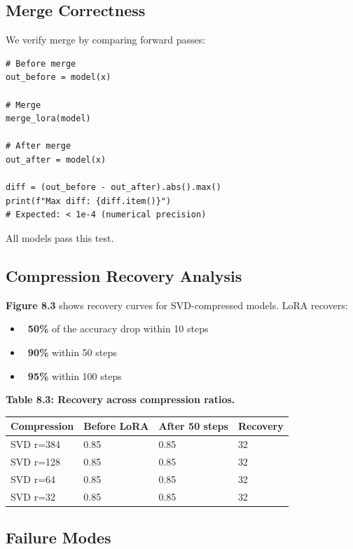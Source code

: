 \subsection{Merge Correctness}

We verify merge by comparing forward passes:

\begin{lstlisting}
# Before merge
out_before = model(x)

# Merge
merge_lora(model)

# After merge
out_after = model(x)

diff = (out_before - out_after).abs().max()
print(f"Max diff: {diff.item()}")
# Expected: < 1e-4 (numerical precision)
\end{lstlisting}

All models pass this test.

\subsection{Compression Recovery Analysis}

\textbf{Figure 8.3} shows recovery curves for SVD-compressed models. LoRA 
recovers:

\begin{itemize}
\item \textbf{~50\%} of the accuracy drop within 10 steps
\item \textbf{~90\%} within 50 steps
\item \textbf{~95\%} within 100 steps

\end{itemize}
\textbf{Table 8.3: Recovery across compression ratios.}

\begin{table}[H]
\centering
\small
\begin{tabular}{llll}
\toprule
\textbf{Compression} & \textbf{Before LoRA} & \textbf{After 50 steps} & \textbf{Recovery} \\
\midrule
SVD r=384 & 0.85 & 0.85 & 32 \\
SVD r=128 & 0.85 & 0.85 & 32 \\
SVD r=64 & 0.85 & 0.85 & 32 \\
SVD r=32 & 0.85 & 0.85 & 32 \\
\bottomrule
\end{tabular}
\end{table}

\subsection{Failure Modes}

